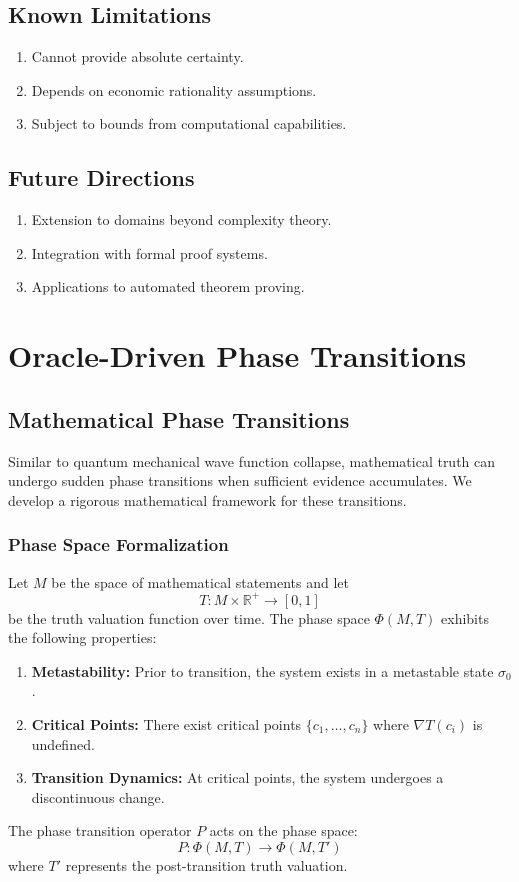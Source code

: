 \documentclass[11pt]{article}
\begin{document}
\subsection{Known Limitations}

\begin{enumerate}[label=(\arabic*)]
    \item Cannot provide absolute certainty.
    \item Depends on economic rationality assumptions.
    \item Subject to bounds from computational capabilities.
\end{enumerate}

\subsection{Future Directions}

\begin{enumerate}[label=(\arabic*)]
    \item Extension to domains beyond complexity theory.
    \item Integration with formal proof systems.
    \item Applications to automated theorem proving.
\end{enumerate}

\section{Oracle-Driven Phase Transitions}

\subsection{Mathematical Phase Transitions}

Similar to quantum mechanical wave function collapse, mathematical truth can undergo sudden phase transitions when sufficient evidence accumulates. We develop a rigorous mathematical framework for these transitions.

\subsubsection{Phase Space Formalization}

Let $M$ be the space of mathematical statements and let
\[
T: M \times \mathbb{R}^{+} \to [0,1]
\]
be the truth valuation function over time. The phase space $\Phi(M,T)$ exhibits the following properties:
\begin{enumerate}[label=(\arabic*)]
    \item \textbf{Metastability:} Prior to transition, the system exists in a metastable state $\sigma_0$.
    \item \textbf{Critical Points:} There exist critical points $\{c_1, \dots, c_n\}$ where $\nabla T(c_i)$ is undefined.
    \item \textbf{Transition Dynamics:} At critical points, the system undergoes a discontinuous change.
\end{enumerate}
The phase transition operator $P$ acts on the phase space:
\[
P: \Phi(M,T) \to \Phi(M,T')
\]
where $T'$ represents the post-transition truth valuation.
\end{document}
